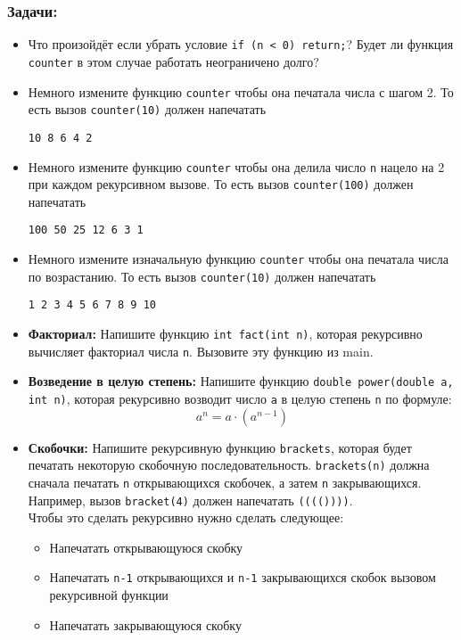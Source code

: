 \documentclass{article}
\begin{document}
\subsubsection*{Задачи:}
\begin{itemize}
\item Что произойдёт если убрать условие \texttt{if (n < 0) return;}? Будет ли функция \texttt{counter} в этом случае работать неограничено долго?
\item Немного измените функцию \texttt{counter} чтобы она печатала числа с шагом 2. То есть вызов \texttt{counter(10)} должен напечатать
\begin{verbatim}
10 8 6 4 2
\end{verbatim}

\item Немного измените функцию \texttt{counter} чтобы она делила число \texttt{n} нацело на 2 при каждом рекурсивном вызове. То есть вызов \texttt{counter(100)} должен напечатать
\begin{verbatim}
100 50 25 12 6 3 1
\end{verbatim}

\item Немного измените изначальную функцию \texttt{counter} чтобы она печатала числа по возрастанию. То есть вызов \texttt{counter(10)} должен напечатать
\begin{verbatim}
1 2 3 4 5 6 7 8 9 10
\end{verbatim}

\item \textbf{Факториал:} Напишите функцию \texttt{int fact(int n)}, которая рекурсивно вычисляет факториал числа \texttt{n}. Вызовите эту функцию из main.

\item \textbf{Возведение в целую степень:} Напишите функцию \texttt{double power(double a, int n)}, которая рекурсивно возводит число \texttt{a} в целую степень \texttt{n} по формуле:
$$
a^n = a \cdot (a^{n-1})
$$

\item \textbf{Скобочки:} Напишите рекурсивную функцию \texttt{brackets}, которая будет печатать некоторую скобочную последовательность. \texttt{brackets(n)} должна сначала печатать \texttt{n} открывающихся скобочек, а затем \texttt{n} закрывающихся. Например, вызов \texttt{bracket(4)} должен напечатать \texttt{(((())))}. \\

Чтобы это сделать рекурсивно нужно сделать следующее:
\begin{itemize}
\item Напечатать открывающуюся скобку
\item Напечатать \texttt{n-1} открывающихся и \texttt{n-1} закрывающихся скобок вызовом рекурсивной функции
\item Напечатать закрывающуюся скобку
\end{itemize}


\end{itemize}
\end{document}
